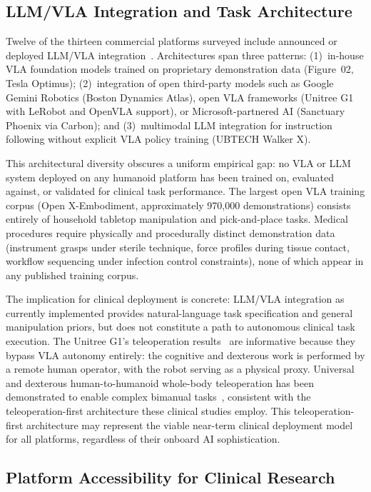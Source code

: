 \subsection{LLM/VLA Integration and Task Architecture}
\label{sec:llmvla}

Twelve of the thirteen commercial platforms surveyed include announced or
deployed LLM/VLA integration~\cite{cao2025humanoid}. Architectures span three
patterns: (1)~in-house VLA foundation models trained on proprietary demonstration
data (Figure~02, Tesla Optimus); (2)~integration of open third-party models such
as Google Gemini Robotics (Boston Dynamics Atlas), open VLA frameworks
(Unitree G1 with LeRobot and OpenVLA support), or Microsoft-partnered AI
(Sanctuary Phoenix via Carbon); and (3)~multimodal LLM integration for
instruction following without explicit VLA policy training (UBTECH Walker X).

This architectural diversity obscures a uniform empirical gap: no VLA or LLM
system deployed on any humanoid platform has been trained on, evaluated against,
or validated for clinical task performance. The largest open VLA training corpus
(Open X-Embodiment, approximately 970,000 demonstrations) consists entirely of
household tabletop manipulation and pick-and-place tasks. Medical procedures
require physically and procedurally distinct demonstration data (instrument
grasps under sterile technique, force profiles during tissue contact, workflow
sequencing under infection control constraints), none of which appear in any
published training corpus.

The implication for clinical deployment is concrete: LLM/VLA integration as
currently implemented provides natural-language task specification and general
manipulation priors, but does not constitute a path to autonomous clinical task
execution. The Unitree G1's teleoperation results~\cite{atar2025humanoids,cho2026humanoid}
are informative because they bypass VLA autonomy entirely: the
cognitive and dexterous work is performed by a remote human operator, with the
robot serving as a physical proxy. Universal and dexterous human-to-humanoid
whole-body teleoperation has been demonstrated to enable complex bimanual
tasks~\cite{he2024omnikh}, consistent with the teleoperation-first architecture
these clinical studies employ. This teleoperation-first architecture may
represent the viable near-term clinical deployment model for all platforms,
regardless of their onboard AI sophistication.

\subsection{Platform Accessibility for Clinical Research}
\label{sec:accessibility}

